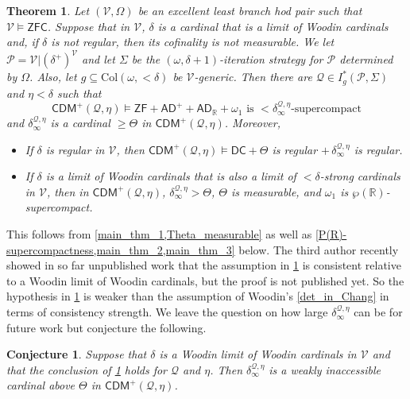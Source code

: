 \documentclass{amsart}
\newtheorem{thm}[dfn]{Theorem}
\newtheorem{conj}[dfn]{Conjecture}
\renewcommand{\subset}{\subseteq}
\newcommand{\power}{\wp}
\begin{document}
\begin{thm}\label{summary_of_main_results}
Let $(\mathcal{V}, \Omega)$ be an excellent least branch hod pair such that $\mathcal{V}\models\mathsf{ZFC}$.
Suppose that in $\mathcal{V}$, $\delta$ is a cardinal that is a limit of Woodin cardinals and, if $\delta$ is not regular, then its cofinality is not measurable.
We let $\mathcal{P}=\mathcal{V}\vert(\delta^+)^{\mathcal{V}}$ and let $\Sigma$ be the $(\omega, \delta+1)$-iteration strategy for $\mathcal{P}$ determined by $\Omega$.
Also, let $g\subset\mathrm{Col}(\omega, {<}\delta)$ be $\mathcal{V}$-generic.
Then there are $\mathcal{Q}\in I^*_g(\mathcal{P}, \Sigma)$ and $\eta<\delta$ such that
\[
\mathsf{CDM}^{+}(\mathcal{Q}, \eta)\models\mathsf{ZF} + \mathsf{AD}^{+} + \mathsf{AD}_{\mathbb{R}} + \text{$\omega_1$ is ${<}\delta^{\mathcal{Q}, \eta}_{\infty}$-supercompact}
\]
and $\delta^{\mathcal{Q}, \eta}_{\infty}$ is a cardinal $\geq\Theta$ in $\mathsf{CDM}^+(\mathcal{Q}, \eta)$.
Moreover,
\begin{itemize}
\item If $\delta$ is regular in $\mathcal{V}$, then $\mathsf{CDM}^{+}(\mathcal{Q}, \eta)\models\mathsf{DC}+\Theta$ is regular $+\,\delta^{\mathcal{Q}, \eta}_{\infty}$ is regular.
\item If $\delta$ is a limit of Woodin cardinals that is also a limit of ${<}\delta$-strong cardinals in $\mathcal{V}$, then in $\mathsf{CDM}^+(\mathcal{Q}, \eta)$, $\delta^{\mathcal{Q}, \eta}_{\infty}>\Theta$, $\Theta$ is measurable, and $\omega_1$ is $\power(\mathbb{R})$-supercompact.
\end{itemize}
\end{thm}

This follows from \cref{main_thm_1,Theta_measurable} as well as \cref{P(R)-supercompactness,main_thm_2,main_thm_3} below.
The third author recently showed in so far unpublished work that the assumption in \cref{summary_of_main_results} is consistent relative to a Woodin limit of Woodin cardinals, but the proof is not published yet.
So the hypothesis in \cref{summary_of_main_results} is weaker than the assumption of Woodin's \cref{det_in_Chang} in terms of consistency strength.
We leave the question on how large $\delta^{\mathcal{Q}, \eta}_{\infty}$ can be for future work but conjecture the following.

\begin{conj}\label{conj_on_value_of_delta_infty}
Suppose that $\delta$ is a Woodin limit of Woodin cardinals in $\mathcal{V}$ and that the conclusion of \cref{summary_of_main_results} holds for $\mathcal{Q}$ and $\eta$.
Then $\delta^{\mathcal{Q}, \eta}_{\infty}$ is a weakly inaccessible cardinal above $\Theta$ in $\mathsf{CDM}^+(\mathcal{Q}, \eta)$.
\end{conj}
\end{document}
